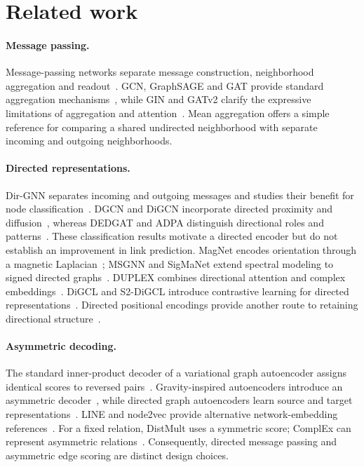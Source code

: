 \documentclass{article}
\begin{document}
\section{Related work}
\paragraph{Message passing.}
Message-passing networks separate message construction, neighborhood aggregation and readout~\cite{mpnn}.
GCN, GraphSAGE and GAT provide standard aggregation mechanisms~\cite{gcn,sage,gat}, while GIN and GATv2 clarify the expressive limitations of aggregation and attention~\cite{gin,gatv2}.
Mean aggregation offers a simple reference for comparing a shared undirected neighborhood with separate incoming and outgoing neighborhoods.

\paragraph{Directed representations.}
Dir-GNN separates incoming and outgoing messages and studies their benefit for node classification~\cite{dirgnn}.
DGCN and DiGCN incorporate directed proximity and diffusion~\cite{dgcn,digcn}, whereas DEDGAT and ADPA distinguish directional roles and patterns~\cite{dedgat,adpa}.
These classification results motivate a directed encoder but do not establish an improvement in link prediction.
MagNet encodes orientation through a magnetic Laplacian~\cite{magnet}; MSGNN and SigMaNet extend spectral modeling to signed directed graphs~\cite{msgnn,sigmanet}.
DUPLEX combines directional attention and complex embeddings~\cite{duplex}.
DiGCL and S2-DiGCL introduce contrastive learning for directed representations~\cite{digcl,s2digcl}.
Directed positional encodings provide another route to retaining directional structure~\cite{digtransformer,multiq}.

\paragraph{Asymmetric decoding.}
The standard inner-product decoder of a variational graph autoencoder assigns identical scores to reversed pairs~\cite{vgae}.
Gravity-inspired autoencoders introduce an asymmetric decoder~\cite{gravity}, while directed graph autoencoders learn source and target representations~\cite{digae}.
LINE and node2vec provide alternative network-embedding references~\cite{line,node2vec}.
For a fixed relation, DistMult uses a symmetric score; ComplEx can represent asymmetric relations~\cite{distmult,complex}.
Consequently, directed message passing and asymmetric edge scoring are distinct design choices.
\end{document}
